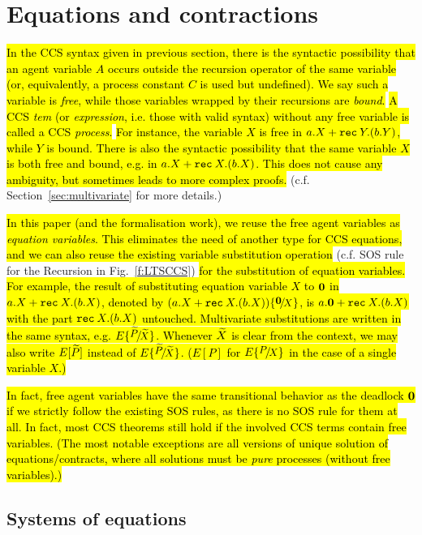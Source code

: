 \section{Equations and contractions}
\label{s:eq}

\hl{In the CCS syntax given in previous section, there is the syntactic
possibility that an agent variable $A$ occurs
outside the recursion operator of the same variable (or, equivalently, a
process constant $C$ is used but undefined). We say such a variable is
\emph{free}, while those variables wrapped by their recursions are
\emph{bound}.}
\hl{A CCS \emph{tem} (or \emph{expression}, i.e. those with valid syntax)
without any free variable is called a CCS \emph{process}.}
\hl{For instance, the variable $X$ is free in $a.X + {\tt rec}\: Y . (b.Y)$, while $Y$
is bound. There is also the syntactic possibility that the same
variable $X$ is
both free and bound, e.g. in $a.X + {\tt rec}\: X . (b.X)$.
This does not cause any ambiguity, but sometimes leads to more
complex proofs.} (c.f. Section~\ref{sec:multivariate} for more details.)

\hl{In this paper (and the formalisation work), we reuse the free agent
variables as \emph{equation variables}. This eliminates the need of
another type for CCS equations, and we can also reuse the existing
variable substitution operation} (c.f. SOS rule for the Recursion in
Fig.~\ref{f:LTSCCS}) \hl{for the substitution of equation variables.
For example, the result of substituting equation variable $X$ to ${\boldsymbol 0}$ in $a.X +
{\tt rec}\: X . (b.X)$, denoted by $(a.X + \recu X (b.X)) \sub {\nil} X$, is
$a.{\boldsymbol 0} + {\tt rec}\: X . (b.X)$ with the part ${\tt rec}\: X . (b.X)$
untouched. Multivariate substitutions are written in the same syntax,
e.g. $E \sub {\til P} {\til X}$. Whenever $\widetilde X$ is clear from the
context, we may also write $E[\widetilde P]$ instead of $E \sub {\til P} {\til
  X}$. ($E[P]$ for $E \sub P X$ in the case of a single variable $X$.)}

\hl{In fact, free agent variables have the same transitional behavior
as the deadlock ${\boldsymbol 0}$ if we strictly follow the existing SOS rules, as there is
no SOS rule for them at all. In fact, most CCS theorems still hold if
the involved CCS terms contain free variables. (The most notable
exceptions are all versions of unique solution of equations/contracts,
where all solutions must be \emph{pure} processes (without free variables).)}

\subsection{Systems of equations}
\label{ss:SysEq}

